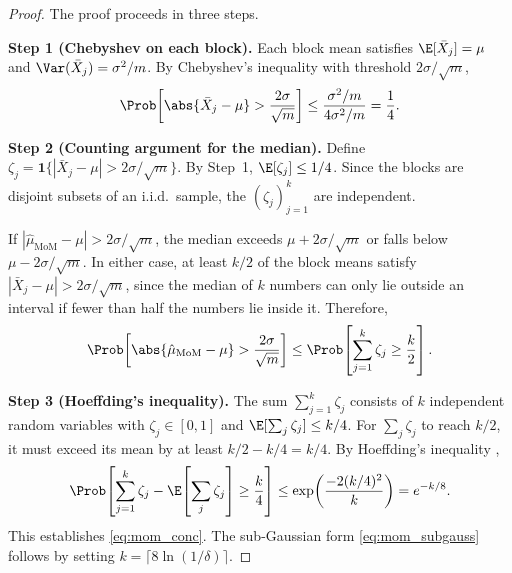 \begin{proof}
The proof proceeds in three steps.

\medskip\noindent\textbf{Step 1 (Chebyshev on each block).} Each block mean satisfies $\E[\bar{X}_j] = \mu$ and $\Var(\bar{X}_j) = \sigma^2/m$. By Chebyshev's inequality with threshold $2\sigma/\sqrt{m}$,
\[
    \Prob\!\left[\abs{\bar{X}_j - \mu} > \frac{2\sigma}{\sqrt{m}}\right] \leq \frac{\sigma^2/m}{4\sigma^2/m} = \frac{1}{4}.
\]

\medskip\noindent\textbf{Step 2 (Counting argument for the median).} Define $\zeta_j = \mathbf{1}\{|\bar{X}_j - \mu| > 2\sigma/\sqrt{m}\}$. By Step~1, $\E[\zeta_j] \leq 1/4$. Since the blocks are disjoint subsets of an i.i.d.\ sample, the $(\zeta_j)_{j=1}^{k}$ are independent.

If $|\hat{\mu}_{\mathrm{MoM}} - \mu| > 2\sigma/\sqrt{m}$, the median exceeds $\mu + 2\sigma/\sqrt{m}$ or falls below $\mu - 2\sigma/\sqrt{m}$. In either case, at least $k/2$ of the block means satisfy $|\bar{X}_j - \mu| > 2\sigma/\sqrt{m}$, since the median of $k$ numbers can only lie outside an interval if fewer than half the numbers lie inside it. Therefore,
\[
    \Prob\!\left[\abs{\hat{\mu}_{\mathrm{MoM}} - \mu} > \frac{2\sigma}{\sqrt{m}}\right] \leq \Prob\!\left[\sum_{j=1}^{k} \zeta_j \geq \frac{k}{2}\right].
\]

\medskip\noindent\textbf{Step 3 (Hoeffding's inequality).} The sum $\sum_{j=1}^{k}\zeta_j$ consists of $k$ independent random variables with $\zeta_j \in [0,1]$ and $\E[\sum_j \zeta_j] \leq k/4$. For $\sum_j \zeta_j$ to reach $k/2$, it must exceed its mean by at least $k/2 - k/4 = k/4$. By Hoeffding's inequality \citep{hoeffding1963probability},
\[
    \Prob\!\left[\sum_{j=1}^{k} \zeta_j - \E\!\left[\sum_j \zeta_j\right] \geq \frac{k}{4}\right] \leq \exp\!\left(\frac{-2(k/4)^2}{k}\right) = e^{-k/8}.
\]
This establishes \eqref{eq:mom_conc}. The sub-Gaussian form \eqref{eq:mom_subgauss} follows by setting $k = \lceil 8\ln(1/\delta)\rceil$.
\end{proof}

